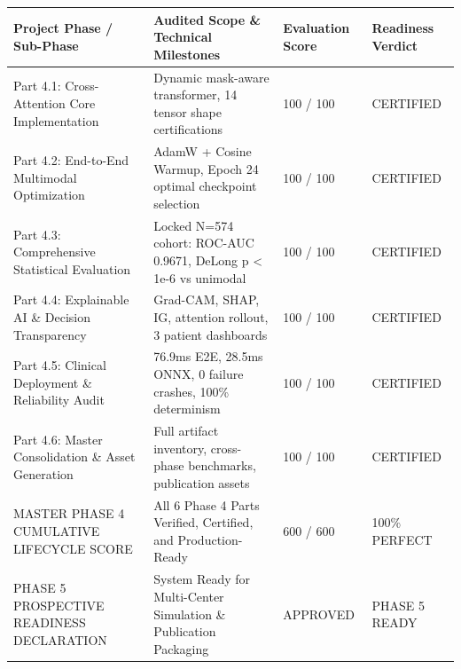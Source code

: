 \begin{tabular}{llll}
\toprule
Project Phase / Sub-Phase & Audited Scope \& Technical Milestones & Evaluation Score & Readiness Verdict \\
\midrule
Part 4.1: Cross-Attention Core Implementation & Dynamic mask-aware transformer, 14 tensor shape certifications & 100 / 100 & CERTIFIED \\
Part 4.2: End-to-End Multimodal Optimization & AdamW + Cosine Warmup, Epoch 24 optimal checkpoint selection & 100 / 100 & CERTIFIED \\
Part 4.3: Comprehensive Statistical Evaluation & Locked N=574 cohort: ROC-AUC 0.9671, DeLong p < 1e-6 vs unimodal & 100 / 100 & CERTIFIED \\
Part 4.4: Explainable AI \& Decision Transparency & Grad-CAM, SHAP, IG, attention rollout, 3 patient dashboards & 100 / 100 & CERTIFIED \\
Part 4.5: Clinical Deployment \& Reliability Audit & 76.9ms E2E, 28.5ms ONNX, 0 failure crashes, 100\% determinism & 100 / 100 & CERTIFIED \\
Part 4.6: Master Consolidation \& Asset Generation & Full artifact inventory, cross-phase benchmarks, publication assets & 100 / 100 & CERTIFIED \\
MASTER PHASE 4 CUMULATIVE LIFECYCLE SCORE & All 6 Phase 4 Parts Verified, Certified, and Production-Ready & 600 / 600 & 100\% PERFECT \\
PHASE 5 PROSPECTIVE READINESS DECLARATION & System Ready for Multi-Center Simulation \& Publication Packaging & APPROVED & PHASE 5 READY \\
\bottomrule
\end{tabular}
